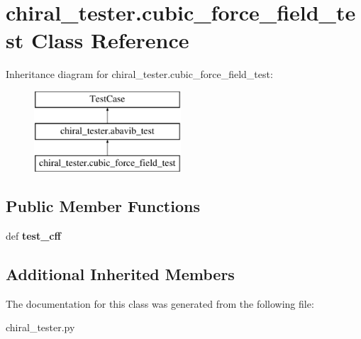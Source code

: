 \hypertarget{classchiral__tester_1_1cubic__force__field__test}{\section{chiral\+\_\+tester.\+cubic\+\_\+force\+\_\+field\+\_\+test Class Reference}
\label{classchiral__tester_1_1cubic__force__field__test}
}
Inheritance diagram for chiral\+\_\+tester.\+cubic\+\_\+force\+\_\+field\+\_\+test\+:\begin{figure}[H]
\begin{center}
\leavevmode
\includegraphics[height=3.000000cm]{classchiral__tester_1_1cubic__force__field__test}
\end{center}
\end{figure}
\subsection*{Public Member Functions}
\begin{DoxyCompactItemize}
\item 
\hypertarget{classchiral__tester_1_1cubic__force__field__test_ac7781a2d34591807e151814d40e82e66}{def {\bfseries test\+\_\+cff}}\label{classchiral__tester_1_1cubic__force__field__test_ac7781a2d34591807e151814d40e82e66}

\end{DoxyCompactItemize}
\subsection*{Additional Inherited Members}


The documentation for this class was generated from the following file\+:\begin{DoxyCompactItemize}
\item 
chiral\+\_\+tester.\+py\end{DoxyCompactItemize}
